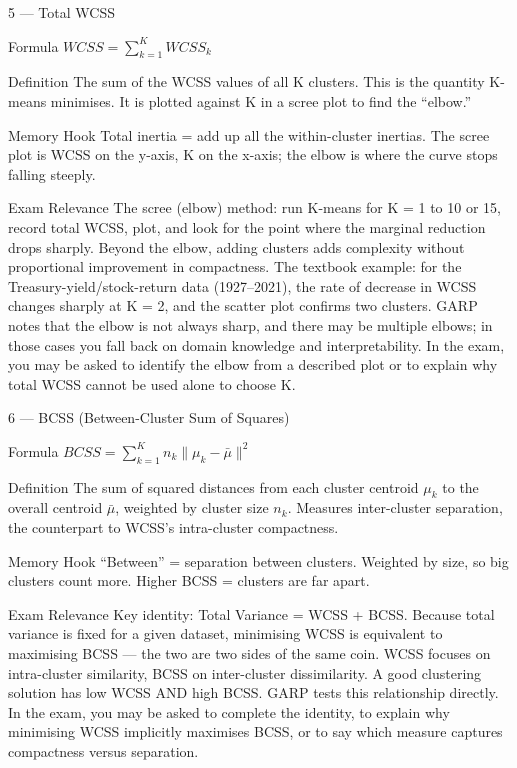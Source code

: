 \documentclass[aspectratio=169,8pt]{beamer}
\begin{document}
	\begin{frame}{5 --- Total WCSS}
		\begin{block}{Formula}
			$WCSS = \sum_{k=1}^{K} WCSS_k$
		\end{block}
		\begin{block}{Definition}
			The sum of the WCSS values of all K clusters. This is the quantity K-means minimises. It is plotted against K in a scree plot to find the ``elbow.''
		\end{block}
		\begin{block}{Memory Hook}
			Total inertia = add up all the within-cluster inertias. The scree plot is WCSS on the y-axis, K on the x-axis; the elbow is where the curve stops falling steeply.
		\end{block}
		\begin{block}{Exam Relevance}
			The scree (elbow) method: run K-means for K = 1 to 10 or 15, record total WCSS, plot, and look for the point where the marginal reduction drops sharply. Beyond the elbow, adding clusters adds complexity without proportional improvement in compactness. The textbook example: for the Treasury-yield/stock-return data (1927--2021), the rate of decrease in WCSS changes sharply at K = 2, and the scatter plot confirms two clusters. GARP notes that the elbow is not always sharp, and there may be multiple elbows; in those cases you fall back on domain knowledge and interpretability. In the exam, you may be asked to identify the elbow from a described plot or to explain why total WCSS cannot be used alone to choose K.
		\end{block}
	\end{frame}
	
	\begin{frame}{6 --- BCSS (Between-Cluster Sum of Squares)}
		\begin{block}{Formula}
			$BCSS = \sum_{k=1}^{K} n_k \|\mu_k - \bar{\mu}\|^2$
		\end{block}
		\begin{block}{Definition}
			The sum of squared distances from each cluster centroid $\mu_k$ to the overall centroid $\bar{\mu}$, weighted by cluster size $n_k$. Measures inter-cluster separation, the counterpart to WCSS's intra-cluster compactness.
		\end{block}
		\begin{block}{Memory Hook}
			``Between'' = separation between clusters. Weighted by size, so big clusters count more. Higher BCSS = clusters are far apart.
		\end{block}
		\begin{block}{Exam Relevance}
			Key identity: Total Variance = WCSS + BCSS. Because total variance is fixed for a given dataset, minimising WCSS is equivalent to maximising BCSS --- the two are two sides of the same coin. WCSS focuses on intra-cluster similarity, BCSS on inter-cluster dissimilarity. A good clustering solution has low WCSS AND high BCSS. GARP tests this relationship directly. In the exam, you may be asked to complete the identity, to explain why minimising WCSS implicitly maximises BCSS, or to say which measure captures compactness versus separation.
		\end{block}
	\end{frame}
	
\end{document}
